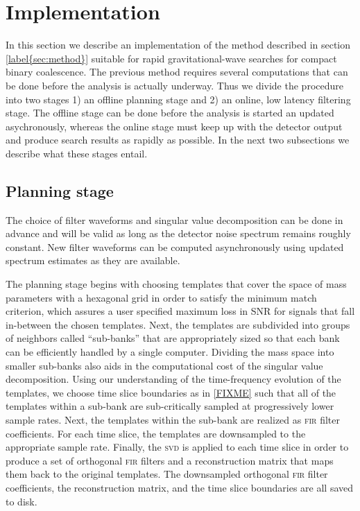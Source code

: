 \section{Implementation}

In this section we describe an implementation of the method described in
section \ref{label{sec:method}} suitable for rapid gravitational-wave searches
for compact binary coalescence.  The previous method requires several
computations that can be done before the analysis is actually underway.  Thus
we divide the procedure into two stages 1) an offline planning stage and 2) an
online, low latency filtering stage.  The offline stage can be done before the
analysis is started an updated asychronously, whereas the online stage must keep
up with the detector output and produce search results as rapidly as possible.
In the next two subsections we describe what these stages entail.

\subsection{Planning stage}

The choice of filter waveforms and singular value decomposition can be done in
advance and will be valid as long as the detector noise spectrum remains
roughly constant.  New filter waveforms can be computed asynchronously using
updated spectrum estimates as they are available. 

The planning stage begins with choosing templates that cover the space of mass
parameters with a hexagonal grid \cite{PhysRevD.76.102004} in order to satisfy
the minimum match criterion, which assures a user specified maximum loss in SNR
for signals that fall in-between the chosen templates.  Next, the templates are
subdivided into groups of neighbors called ``sub-banks'' that are appropriately
sized so that each bank can be efficiently handled by a single computer.
Dividing the mass space into smaller sub-banks also aids in the computational
cost of the singular value decomposition.  Using our understanding of the
time-frequency evolution of the templates, we choose time slice boundaries as
in \eqref{FIXME} such that all of the templates within a sub-bank are
sub-critically sampled at progressively lower sample rates.  Next, the
templates within the sub-bank are realized as \textsc{fir} filter coefficients.
For each time slice, the templates are downsampled to the appropriate sample
rate.  Finally, the \textsc{svd} is applied to each time slice in order to
produce a set of orthogonal \textsc{fir} filters and a reconstruction matrix
that maps them back to the original templates.  The downsampled orthogonal
\textsc{fir} filter coefficients, the reconstruction matrix, and the time slice
boundaries are all saved to disk.

